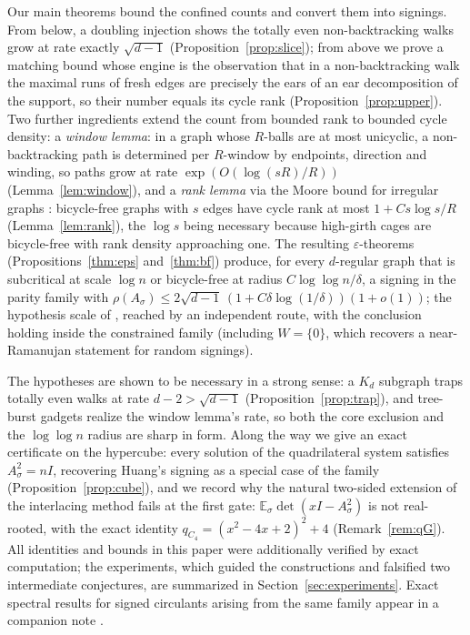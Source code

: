 \documentclass[11pt]{article}
\theoremstyle{remark}
\begin{document}
Our main theorems bound the confined counts and convert them into
signings. From below, a doubling injection shows the totally even
non-backtracking walks grow at rate exactly $\sqrt{d-1}$
(Proposition~\ref{prop:slice}); from above we prove a matching bound
whose engine is the observation that in a non-backtracking walk the
maximal runs of fresh edges are precisely the ears of an ear
decomposition of the support, so their number equals its cycle rank
(Proposition~\ref{prop:upper}). Two further ingredients extend the
count from bounded rank to bounded cycle density: a \emph{window
lemma}: in a graph whose $R$-balls are at most unicyclic, a
non-backtracking path is determined per $R$-window by endpoints,
direction and winding, so paths grow at rate $\exp(O(\log(sR)/R))$
(Lemma~\ref{lem:window}), and a \emph{rank lemma} via the Moore
bound for irregular graphs \cite{ahl02}: bicycle-free graphs with $s$
edges have cycle rank at most $1+Cs\log s/R$
(Lemma~\ref{lem:rank}), the $\log s$ being necessary because
high-girth cages are bicycle-free with rank density approaching one.
The resulting $\varepsilon$-theorems
(Propositions~\ref{thm:eps} and~\ref{thm:bf}) produce, for every
$d$-regular graph that is subcritical at scale $\log n$ or
bicycle-free at radius $C\log\log n/\delta$, a signing in the parity
family with
$\rho(A_\sigma)\le2\sqrt{d-1}\,(1+C\delta\log(1/\delta))(1+o(1))$; 
the hypothesis scale of \cite{mop20}, reached by an independent route,
with the conclusion holding inside the constrained family (including
$W=\{0\}$, which recovers a near-Ramanujan statement for random
signings).

The hypotheses are shown to be necessary in a strong sense: a $K_d$
subgraph traps totally even walks at rate $d-2>\sqrt{d-1}$
(Proposition~\ref{prop:trap}), and tree-burst gadgets realize the
window lemma's rate, so both the core exclusion and the
$\log\log n$ radius are sharp in form. Along the way we give an exact
certificate on the hypercube: every solution of the quadrilateral
system satisfies $A_\sigma^2=nI$, recovering Huang's signing
\cite{huang19} as a special case of the family
(Proposition~\ref{prop:cube}), and we record why the natural
two-sided extension of the interlacing method fails at the first
gate: $\mathbb E_\sigma\det(xI-A_\sigma^2)$ is not real-rooted, with
the exact identity $q_{C_4}=(x^2-4x+2)^2+4$
(Remark~\ref{rem:qG}). All identities and bounds in this paper were
additionally verified by exact computation; the experiments, which
guided the constructions and falsified two intermediate conjectures,
are summarized in Section~\ref{sec:experiments}. Exact spectral
results for signed circulants arising from the same family appear in
a companion note \cite{companion}.
\end{document}
